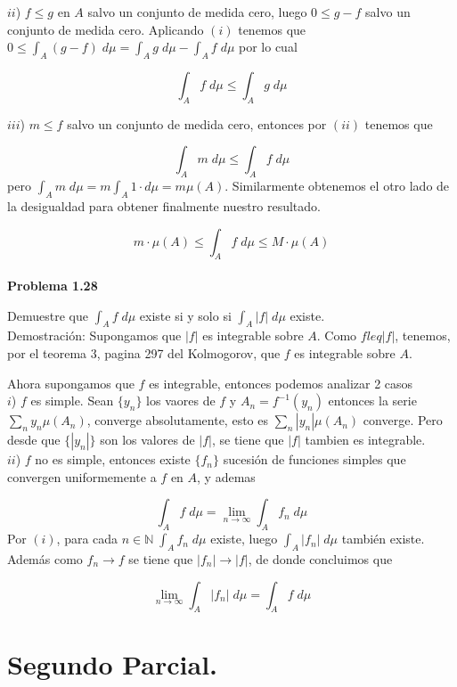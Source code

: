 \documentclass[12pt]{article}
\begin{document}
    $ii$) $f \leq g$ en $A$ salvo un conjunto de medida cero, luego $0 \leq g-f$ salvo un
    conjunto de medida cero. Aplicando $(i)$ tenemos que 
    $0 \leq \int_A (g-f)\;d\mu = \int_A g\;d\mu -\int_A f\;d\mu$ por lo cual

    \[\int_A f\;d\mu \leq \int_A g\; d\mu\]

    $iii$) $m \leq f$ salvo un conjunto de medida cero, entonces por $(ii)$ tenemos que 
    
    \[\int_A m\; d\mu \leq \int_A f\; d\mu\]
    pero $\int_A m\; d\mu = m \int_A 1\cdot d\mu = m\mu(A)$. Similarmente obtenemos el otro
    lado de la desigualdad para obtener finalmente nuestro resultado.

    \[m\cdot\mu(A) \leq \int_A f\; d\mu  \leq M\cdot\mu(A)\]
    \\

    \textbf{Problema 1.28}

    Demuestre que $\int_A f\;d\mu$ existe si y solo si $\int_A |f|\;d\mu$ existe.
    \\

    Demostraci\'on: Supongamos que $|f|$ es integrable sobre $A$. Como $f leq |f|$, tenemos,
    por el teorema 3, pagina 297 del Kolmogorov, que $f$ es integrable sobre $A$. 

    Ahora supongamos que $f$ es integrable, entonces podemos analizar 2 casos
    \\

    $i$) $f$ es simple. Sean $\{y_n\}$ los vaores de $f$ y $A_n = f^{-1}(y_n)$ entonces la 
    serie $\sum_n y_n\mu(A_n)$, converge absolutamente, esto es $\sum_n |y_n|\mu(A_n)$ 
    converge. Pero desde que $\{|y_n|\}$ son los valores de $|f|$, se tiene que $|f|$
    tambien es integrable.
    \\
    
    $ii$) $f$ no es simple, entonces existe $\{f_n\}$ sucesi\'on de funciones simples 
    que convergen uniformemente a $f$ en $A$, y ademas 

    \[\int_A f\;d\mu = \lim_{n\rightarrow \infty} \int_A f_n\;d\mu\]
    Por $(i)$, para cada $n\in \mathbb{N}\; \int_A f_n\; d\mu$ existe, luego 
    $\int_A |f_n|\; d\mu$ tambi\'en existe. Adem\'as como $f_n\rightarrow f$ se tiene que 
    $|f_n|\rightarrow |f|$, de donde concluimos que 

    \[\lim_{n\rightarrow \infty} \int_A |f_n|\; d\mu = \int_A f\; d\mu\]
    \newpage

    \section{Segundo Parcial.}
\end{document}
